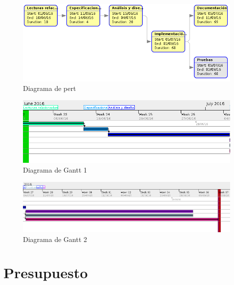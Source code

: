 \newpage
\begin{figure}[!ht]
  \begin{center}
    \includegraphics[width=1\textwidth]{../images/diag_plan/pert.png}
    \caption{Diagrama de pert}
    \label{fig:pert}
  \end{center}
\end{figure}

\begin{figure}[!ht]
  \begin{center}
    \includegraphics[width=1\textwidth]{../images/diag_plan/gantt1.png}
    \caption{Diagrama de Gantt 1}
    \label{fig:diag_gant1}
  \end{center}
\end{figure}

\begin{figure}[!ht]
  \begin{center}
    \includegraphics[width=1\textwidth]{../images/diag_plan/gantt2.png}
    \caption{Diagrama de Gantt 2}
    \label{fig:diag_gant2}
  \end{center}
\end{figure}

\newpage

\section{Presupuesto}

